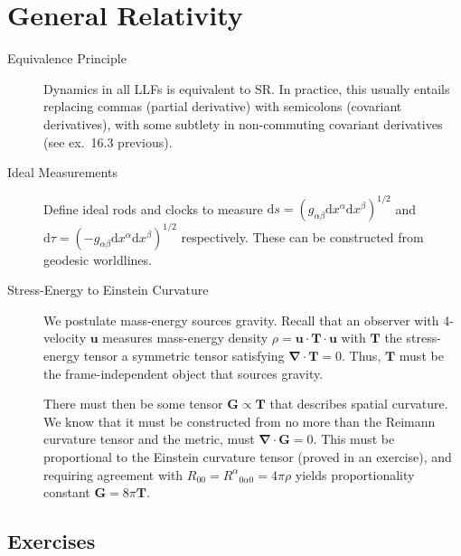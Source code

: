 \documentclass[12pt]{report}
\newcommand{\bm}[1]{\boldsymbol{\mathbf{#1}}}
\begin{document}
\section{General Relativity}

\begin{description}
    \item[Equivalence Principle] Dynamics in all LLFs is equivalent to SR\@. In
        practice, this usually entails replacing commas (partial derivative)
        with semicolons (covariant derivatives), with some subtlety in
        non-commuting covariant derivatives (see ex.\ 16.3 previous).

    \item[Ideal Measurements] Define ideal rods and clocks to measure
        $\mathrm{d}s = (g_{\alpha\beta}\mathrm{d}x^\alpha
        \mathrm{d}x^\beta)^{1/2}$ and
        $\mathrm{d}\tau = (-g_{\alpha\beta}\mathrm{d}x^\alpha
        \mathrm{d}x^\beta)^{1/2}$ respectively. These can be constructed from
        geodesic worldlines.

    \item[Stress-Energy to Einstein Curvature] We postulate mass-energy sources
        gravity. Recall that an observer with 4-velocity $\bm{u}$ measures
        mass-energy density $\rho = \bm{u} \cdot \bm{T} \cdot \bm{u}$ with
        $\bm{T}$ the stress-energy tensor a symmetric tensor satisfying
        $\bm{\nabla} \cdot \bm{T} = 0$. Thus, $\bm{T}$ must be the
        frame-independent object that sources gravity.

        There must then be some tensor $\bm{G} \propto \bm{T}$ that describes
        spatial curvature. We know that it must be constructed from no more than
        the Reimann curvature tensor and the metric, must $\bm{\nabla} \cdot
        \bm{G} = 0$.  This must be proportional to the Einstein curvature tensor
        (proved in an exercise), and requiring agreement with $R_{00} =
        {R^\alpha}_{0\alpha 0} = 4\pi\rho$ yields proportionality constant
        $\bm{G} = 8\pi \bm{T}$.
\end{description}

\subsection{Exercises}
\end{document}

